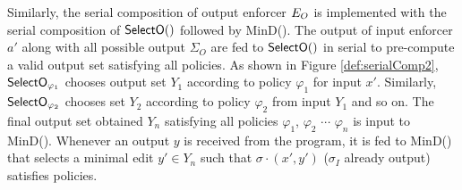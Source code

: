 Similarly, the serial composition of output enforcer $E_{O}$ is implemented with the serial composition of $\mathsf{SelectO}()$ followed by MinD(). The output of input enforcer $a'$ along with all possible output $\Sigma_O$ are fed to $\mathsf{SelectO}()$ in serial to pre-compute a valid output set satisfying all policies. As shown in Figure \ref{def:serialComp2}, $\mathsf{SelectO}_{\varphi_{1}}$ chooses output set $Y_1$ according to policy $\varphi_{1}$ for input $x'$. Similarly, $\mathsf{SelectO}_{\varphi_{2}}$ chooses set $Y_2$ according to policy $\varphi_{2}$ from input $Y_1$ and so on. The final output set  obtained $Y_n$ satisfying all policies $\varphi_1$, $\varphi_2$ $\cdots$ $\varphi_n$ is input to MinD(). Whenever an output $y$ is received from the program, it is fed to MinD() that selects a minimal edit $y' \in Y_n$  such that $\sigma \cdot (x',y') $ ($\sigma_I$ already output) satisfies policies. 





